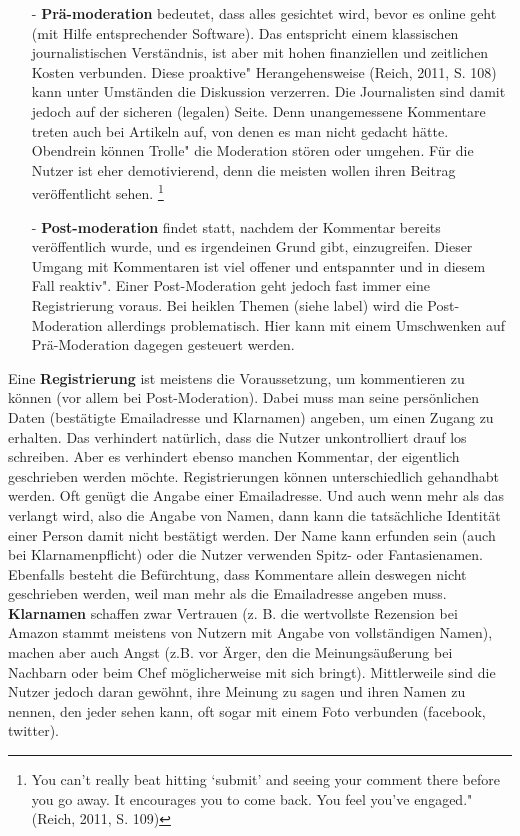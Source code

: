 \begin{itemize}
\item[-] {\bf Prä-moderation} bedeutet, dass alles gesichtet wird, bevor es online geht (mit Hilfe entsprechender Software). Das entspricht einem klassischen journalistischen Verständnis, ist aber mit hohen finanziellen und zeitlichen Kosten verbunden. Diese \glqq proaktive" Herangehensweise (Reich, 2011, S. 108) kann unter Umständen die Diskussion verzerren. Die Journalisten sind damit jedoch auf der sicheren (legalen) Seite. Denn unangemessene Kommentare treten auch bei Artikeln auf, von denen es man nicht gedacht hätte. Obendrein können \glqq Trolle" die Moderation stören oder umgehen. Für die Nutzer ist  eher demotivierend, denn die meisten wollen ihren Beitrag veröffentlicht sehen. \footnote{\glqq You can’t really beat hitting ‘submit’ and seeing your comment there before you go
away. It encourages you to come back. You feel you’ve engaged." (Reich, 2011, S. 109)}
\item[-] {\bf Post-moderation} findet statt, nachdem der Kommentar bereits veröffentlich wurde, und es irgendeinen Grund gibt, einzugreifen. Dieser Umgang mit Kommentaren ist viel offener und entspannter und in diesem Fall \glqq reaktiv". Einer Post-Moderation geht jedoch fast immer eine Registrierung voraus. Bei heiklen Themen (siehe label) wird die Post-Moderation allerdings problematisch. Hier kann mit einem Umschwenken auf Prä-Moderation dagegen gesteuert werden.
\end{itemize}
Eine {\bf Registrierung} ist meistens die Voraussetzung, um kommentieren zu können (vor allem bei Post-Moderation). Dabei muss man seine persönlichen Daten (bestätigte Emailadresse und Klarnamen) angeben, um einen Zugang zu erhalten. Das verhindert natürlich, dass die Nutzer unkontrolliert drauf los schreiben. Aber es verhindert ebenso manchen Kommentar, der eigentlich geschrieben werden möchte. 
Registrierungen können unterschiedlich gehandhabt werden. Oft genügt die Angabe einer Emailadresse. Und auch wenn mehr als das verlangt wird, also die Angabe von Namen, dann kann die tatsächliche Identität einer Person damit nicht bestätigt werden. Der Name kann erfunden sein (auch bei Klarnamenpflicht) oder die Nutzer verwenden Spitz- oder Fantasienamen. Ebenfalls besteht die Befürchtung, dass Kommentare allein deswegen nicht geschrieben werden, weil man mehr als die Emailadresse angeben muss. 
{\bf Klarnamen} schaffen zwar Vertrauen (z. B. die wertvollste Rezension bei Amazon stammt meistens von Nutzern mit Angabe von vollständigen Namen), machen aber auch Angst (z.B. vor Ärger, den die Meinungsäußerung bei Nachbarn oder beim Chef möglicherweise mit sich bringt). Mittlerweile sind die Nutzer jedoch daran gewöhnt, ihre Meinung zu sagen und ihren Namen zu nennen, den jeder sehen kann, oft sogar mit einem Foto verbunden (facebook, twitter). 



